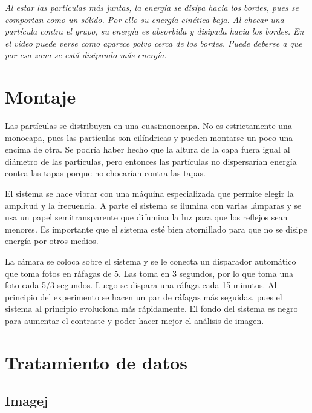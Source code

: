 \documentclass[twoside]{article}
\begin{document}
\begin{multicols}{2}
\emph{Al estar las part\'iculas m\'as juntas, la energ\'ia se disipa hacia los bordes, pues se comportan como un s\'olido. Por ello su energ\'ia cin\'etica baja. Al chocar una part\'icula contra el grupo, su energ\'ia es absorbida y disipada hacia los bordes. En el video puede verse como aparece polvo cerca de los bordes. Puede deberse a que por esa zona se est\'a disipando m\'as energ\'ia.}


\section*{Montaje}

Las part\'iculas se distribuyen en una cuasimonocapa. No es estrictamente una monocapa, pues las part\'iculas son cil\'indricas y pueden montarse un poco una encima de otra. Se podr\'ia haber hecho que la altura de la capa fuera igual al di\'ametro de las part\'iculas, pero entonces las part\'iculas no dispersar\'ian energ\'ia contra las tapas porque no chocar\'ian contra las tapas.

El sistema se hace vibrar con una m\'aquina especializada que permite elegir la amplitud y la frecuencia. A parte el sistema se ilumina con varias l\'amparas y se usa un papel semitransparente que difumina la luz para que los reflejos sean menores. Es importante que el sistema est\'e bien atornillado para que no se disipe energ\'ia por otros medios.

La c\'amara se coloca sobre el sistema y se le conecta un disparador autom\'atico que toma fotos en r\'afagas de 5. Las toma en 3 segundos, por lo que toma una foto cada 5/3 segundos. Luego se dispara una r\'afaga cada 15 minutos. Al principio del experimento se hacen un par de r\'afagas m\'as seguidas, pues el sistema al principio evoluciona m\'as r\'apidamente. El fondo del sistema es negro para aumentar el contraste y poder hacer mejor el an\'alisis de imagen.


\section*{Tratamiento de datos}

\subsection*{Imagej}


\end{multicols}
\end{document}
